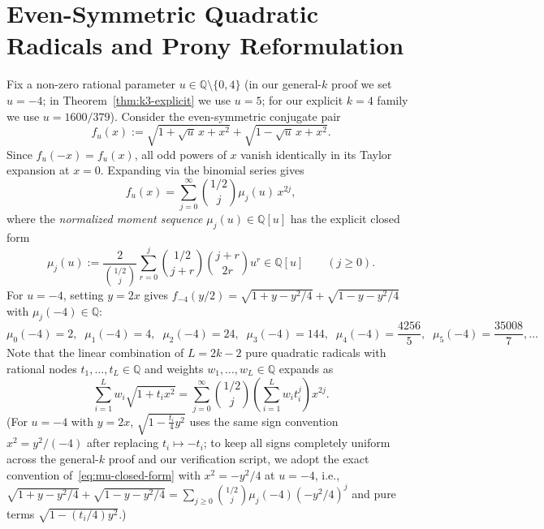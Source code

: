 \documentclass[11pt,a4paper]{article}
\theoremstyle{definition}
\theoremstyle{remark}
\newcommand{\QQ}{\mathbb{Q}}
\begin{document}
\section{Even-Symmetric Quadratic Radicals and Prony Reformulation}
\label{sec:prony}

Fix a non-zero rational parameter $u \in \QQ \setminus \{0, 4\}$ (in our general-$k$ proof we set $u = -4$; in Theorem~\ref{thm:k3-explicit} we use $u = 5$; for our explicit $k = 4$ family we use $u = 1600/379$). Consider the even-symmetric conjugate pair
\begin{equation}
\label{eq:conjugate-pair}
f_u(x) := \sqrt{1 + \sqrt{u}\, x + x^2} + \sqrt{1 - \sqrt{u}\, x + x^2}.
\end{equation}
Since $f_u(-x) = f_u(x)$, all odd powers of $x$ vanish identically in its Taylor expansion at $x = 0$. Expanding via the binomial series gives
\[
f_u(x) = \sum_{j=0}^{\infty} \binom{1/2}{j} \mu_j(u)\, x^{2j},
\]
where the \emph{normalized moment sequence} $\mu_j(u) \in \QQ[u]$ has the explicit closed form
\begin{equation}
\label{eq:mu-closed-form}
\mu_j(u) := \frac{2}{\binom{1/2}{j}} \sum_{r=0}^{j} \binom{1/2}{j + r} \binom{j + r}{2 r} u^r \in \QQ[u] \qquad (j \ge 0).
\end{equation}
For $u = -4$, setting $y = 2x$ gives $f_{-4}(y/2) = \sqrt{1 + y - y^2/4} + \sqrt{1 - y - y^2/4}$ with $\mu_j(-4) \in \QQ$:
\[
\mu_0(-4) = 2,\;\; \mu_1(-4) = 4,\;\; \mu_2(-4) = 24,\;\; \mu_3(-4) = 144,\;\; \mu_4(-4) = \frac{4256}{5},\;\; \mu_5(-4) = \frac{35008}{7}, \dots
\]
Note that the linear combination of $L = 2k - 2$ pure quadratic radicals with rational nodes $t_1, \dots, t_L \in \QQ$ and weights $w_1, \dots, w_L \in \QQ$ expands as
\[
\sum_{i=1}^L w_i \sqrt{1 + t_i x^2} = \sum_{j=0}^{\infty} \binom{1/2}{j} \left(\sum_{i=1}^L w_i t_i^j\right) x^{2j}.
\]
(For $u = -4$ with $y = 2x$, $\sqrt{1 - \frac{t_i}{4} y^2}$ uses the same sign convention $x^2 = y^2 / (-4)$ after replacing $t_i \mapsto -t_i$; to keep all signs completely uniform across the general-$k$ proof and our verification script, we adopt the exact convention of~\eqref{eq:mu-closed-form} with $x^2 = -y^2 / 4$ at $u = -4$, i.e., $\sqrt{1 + y - y^2/4} + \sqrt{1 - y - y^2/4} = \sum_{j \ge 0} \binom{1/2}{j} \mu_j(-4) (-y^2/4)^j$ and pure terms $\sqrt{1 - (t_i/4) y^2}$.)
\end{document}
